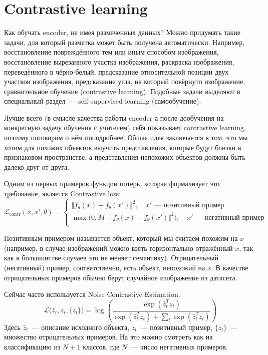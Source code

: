 \section{Contrastive learning}

Как обучать encoder, не имея размеченных данных?
Можно придумать такие задачи, для который разметка может быть получена автоматически.
Например, восстановление повреждённого тем или иным способом изображения, восстановление вырезанного участка изображения,
раскраска изображения, переведённого в чёрно-белый, предсказание относительной позиции двух участков изображения,
предсказание угла, на который повёрнуто изображение, сравнительное обучение (contrastive learning). 
Подобные задачи выделяют в специальный раздел~--- self-supervised learning (самообучение).

Лучше всего (в смысле качества работы encoder-а после дообучения на конкретную задачу обучения с учителем)
себя показывает contrastive learning, поэтому поговорим о нём поподробнее.
Общая идея заключается в том, что мы хотим для похожих объектов выучить представления, 
которые будут близки в признаковом пространстве, а представления непохожих объектов должны быть далеко друг от друга.

Одним из первых примеров функции потерь, которая формализует это требование, является Contrastive loss:
\begin{equation*}
    \mathcal{L}_\text{contr}(x, x', \theta) =
    \begin{cases}
        \Vert f_\theta(x) - f_\theta(x') \Vert^2, \quad x' \text{~--- позитивный пример}\\
        \max \bigl(0, M - \Vert f_\theta(x) - f_\theta(x') \Vert^2\bigr), \quad x' \text{~--- негативный пример}\\
    \end{cases}
\end{equation*}

Позитивным примером называется объект, который мы считаем похожим на $x$ 
(например, в случае изображений можно взять горизонтально отражённый $x$, так как в большинстве случаев это не меняет семантику).
Отрицательный (негативный) пример, соответственно, есть объект, непохожий на $x$. 
В качестве отрицательных примеров обычно берут случайное изображение из датасета.

Сейчас часто используется Noise Contrastive Estimation.
\begin{equation*}
    \mathcal{L}\bigl(\hat{z}_t, z_t, \{z_l\}\bigr) = \log \left( \frac{\exp(\hat{z}_t^T z_t)}{ \exp(\hat{z}_t^T z_t) + \sum_l \exp(\hat{z}_t^T z_l)} \right)
\end{equation*}
Здесь $\hat{z}_t$~--- описание исходного объекта, $z_t$~--- позитивный пример, $\{z_l\}$~--- множество отрицательных примеров.
На это можно смотреть как на классификацию из $N + 1$ классов, где $N$~--- число негативных примеров.

